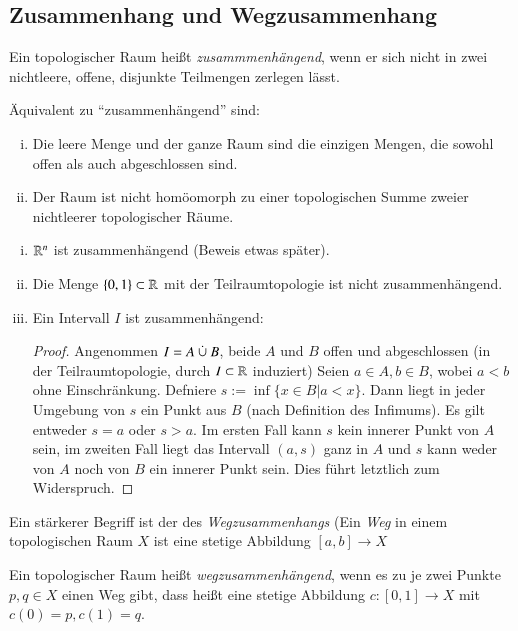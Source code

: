 \documentclass[a4paper,10pt]{scrartcl}
\begin{document}
\subsection{Zusammenhang und Wegzusammenhang}
\begin{df}
Ein topologischer Raum heißt \emph{zusammmenhängend}, wenn er sich nicht in zwei nichtleere, offene, disjunkte Teilmengen zerlegen lässt.
\end{df}
\fixme[fig19]
\begin{note*}
Äquivalent zu "`zusammenhängend"' sind:
\begin{enumerate}[(i)]
\item Die leere Menge und der ganze Raum sind die einzigen Mengen, die sowohl offen als auch abgeschlossen sind.
\item Der Raum ist nicht homöomorph zu einer topologischen Summe zweier nichtleerer topologischer Räume.
\end{enumerate}
\end{note*}
\begin{exs*}
\begin{enumerate}[(i)]
\item $ \mathbb{R}^n $ ist zusammenhängend (Beweis etwas später).
\item Die Menge $ \{0,1\} \subset \mathbb{R}$ mit der Teilraumtopologie ist nicht zusammenhängend.
\item Ein Intervall $ I $ ist zusammenhängend: 
\begin{proof}
Angenommen $I=A\mathbin{\dot{\cup}} B$, beide $ A $ und $ B $ offen und abgeschlossen (in der Teilraumtopologie, durch $ I\subset \mathbb{R} $ induziert) Seien $ a\in A, b\in B $, wobei $ a<b $ ohne Einschränkung. Defniere $ s:=\inf\{x\in B|a<x\}$. Dann liegt in jeder Umgebung von $ s $ ein Punkt aus $ B $ (nach Definition des Infimums). Es gilt entweder $ s=a $ oder $ s>a $. Im ersten Fall kann $ s $ kein innerer Punkt von $ A $ sein, im zweiten Fall liegt das Intervall $ (a,s) $ ganz in $ A $ und $ s $ kann weder von $ A $ noch von $ B $ ein innerer Punkt sein. Dies führt letztlich zum Widerspruch.
\end{proof}
\end{enumerate}
\end{exs*}
Ein stärkerer Begriff ist der des \emph{Wegzusammenhangs} (Ein \emph{Weg} in einem topologischen Raum $ X $ ist eine stetige Abbildung $ [a,b]\to X $
\begin{df}
Ein topologischer Raum heißt \emph{wegzusammenhängend}, wenn es zu je zwei Punkte $ p,q\in X $ einen Weg gibt, dass heißt eine stetige Abbildung $ c: [0,1]\to X $ mit $c(0)=p, c(1)=q$.
\end{df}
\end{document}

